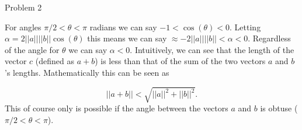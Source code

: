 \begin{problem}{Problem 2}
\begin{highlight}
        For angles $\pi / 2 < \theta < \pi$ radians we can say $-1 < \cos{(\theta) < 0}$. Letting $\alpha = 2||a||||b||\cos{(\theta)}$ this means we can say $\approx -2||a||||b|| < \alpha < 0$. Regardless 
        of the angle for $\theta$ we can say $\alpha < 0$. Intuitively, we can see that the length of the vector $c$ (defined as $a+b$) is less than that of the sum of the two vectors $a$ and $b$'s 
        lengths. Mathematically this can be seen as

        \begin{equation}
            ||a + b|| < \sqrt{||a||^{2} + ||b||^{2}}.
        \end{equation}
        This of course only is possible if the angle between the vectors $a$ and $b$ is obtuse ($\pi / 2 < \theta < \pi$).
    \end{highlight}
\end{problem}

